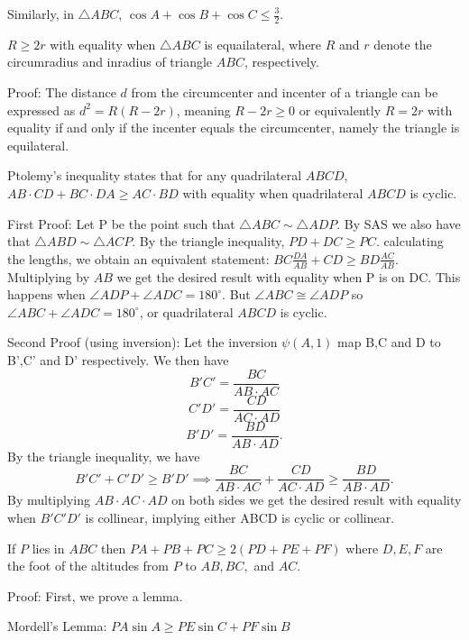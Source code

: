 Similarly, in $\triangle ABC$, $\cos{A}+\cos{B}+\cos{C}\le \frac{3}{2}$.

\begin{theorem}
$R\ge2r$ with equality when $\triangle ABC$ is equailateral, where $R$ and $r$ denote the circumradius and inradius of triangle $ABC$, respectively.
\end{theorem}

Proof: The distance $d$ from the circumcenter and incenter of a triangle can be expressed as $d^2=R(R-2r)$, meaning $R-2r\ge 0$ or equivalently $R=2r$ with equality if and only if the incenter equals the circumcenter, namely the triangle is equilateral.

\begin{theorem}
Ptolemy's inequality states that for any quadrilateral $ABCD$, $AB\cdot CD+BC\cdot DA\ge AC\cdot BD$ with equality when quadrilateral $ABCD$ is cyclic.
\end{theorem}

First Proof: Let P be the point such that $\triangle ABC\sim \triangle ADP$. By SAS we also have that $\triangle ABD\sim \triangle ACP$. By the triangle inequality, $PD+DC\ge PC$. calculating the lengths, we obtain an equivalent statement: $BC\frac{DA}{AB}+CD\ge BD \frac{AC}{AB}$. Multiplying by $AB$ we get the desired result with equality when P is on DC. This happens when $\angle ADP+\angle ADC=180^{\circ}$. But $\angle ABC\cong \angle ADP$ so $\angle ABC+\angle ADC=180^{\circ}$, or quadrilateral $ABCD$ is cyclic.

Second Proof (using inversion): Let the inversion $\psi(A,1)$ map B,C and D to B',C' and D' respectively. We then have\[B'C'=\frac{BC}{AB\cdot AC}\]\[C'D'=\frac{CD}{AC\cdot AD}\]\[B'D'=\frac{BD}{AB\cdot AD}.\]By the triangle inequality, we have\[B'C'+C'D'\ge B'D' \implies \frac{BC}{AB\cdot AC}+\frac{CD}{AC\cdot AD}\ge \frac{BD}{AB\cdot AD}.\]By multiplying $AB\cdot AC\cdot AD$ on both sides we get the desired result with equality when $B'C'D'$ is collinear, implying either ABCD is cyclic or collinear.

\begin{theorem}
If $P$ lies in $ABC$ then $PA+PB+PC\ge 2(PD+PE+PF)$ where $D, E, F$ are the foot of the altitudes from $P$ to $AB, BC,$ and $AC$.
\end{theorem}

Proof: First, we prove a lemma.

Mordell's Lemma: $PA\sin A\ge PE\sin C+PF\sin B$


